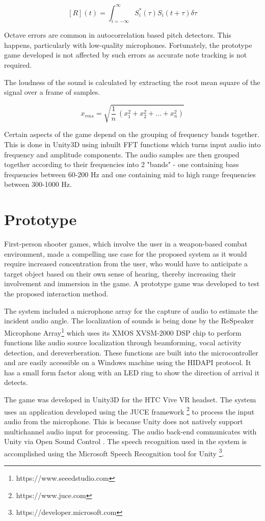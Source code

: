 \documentclass[convention]{aesconf}
\begin{document}
\[ 
[R] (t)  = \int_{i=-{\infty}}^{\infty} S_i^*(\tau) S_i(t+\tau) \delta \tau \]

Octave errors are common in autocorrelation based pitch detectors. This happens, particularly with low-quality microphones. Fortunately, the prototype game developed is not affected by such errors as accurate note tracking is not required.

The loudness of the sound is calculated by extracting the root mean square of the signal over a frame of samples. 

\[
    x_{rms} = \sqrt{ \frac{1}{n}\ (x_1^2 + x_2^2 + ... + x_n^2) }
\]

Certain aspects of the game depend on the grouping of frequency bands together. This is done in Unity3D using inbuilt FFT functions which turns input audio into frequency and amplitude components. The audio samples are then grouped together according to their frequencies into 2 "bands" - one containing bass frequencies between 60-200 Hz and one containing mid to high range frequencies between 300-1000 Hz.

\section{Prototype}
First-person shooter games, which involve the user in a weapon-based combat environment, made a compelling use case for the proposed system as it would require increased concentration from the user, who would have to anticipate a target object based on their own sense of hearing, thereby increasing their involvement and immersion in the game. A prototype game was developed to test the proposed interaction method.

The system included a microphone array for the capture of audio to estimate the incident audio angle. The localization of sounds is being done by the ReSpeaker Microphone Array\footnote{https://www.seeedstudio.com} which uses its XMOS XVSM-2000 DSP chip to perform functions like audio source localization through beamforming, vocal activity detection, and dereverberation. These functions are built into the microcontroller and are easily accessible on a Windows machine using the HIDAPI protocol. It has a small form factor along with an LED ring to show the direction of arrival it detects.

The game was developed in Unity3D for the HTC Vive VR headset. The system uses an application developed using the JUCE framework \footnote{https://www.juce.com} to process the input audio from the microphone. This is because Unity does not natively support multichannel audio input for processing. The audio back-end communicates with Unity via Open Sound Control \cite{wright2005open}. The speech recognition used in the system is accomplished using the Microsoft Speech Recognition tool for Unity \footnote{https://developer.microsoft.com}. 
\end{document}
